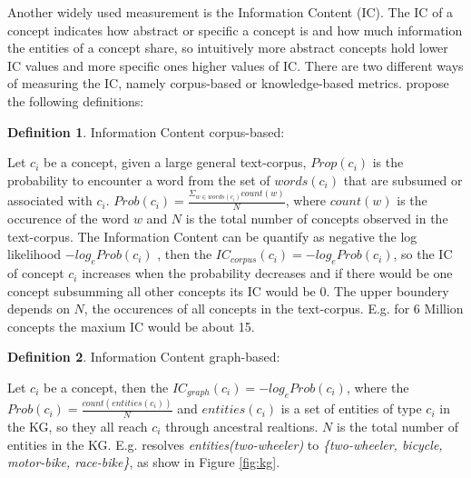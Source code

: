 \documentclass[pdftex,a4paper,12pt]{scrartcl}
\theoremstyle{definition}
\newtheorem{definition}{Definition}[section]
\begin{document}
Another widely used measurement is the Information Content (IC). The IC of a concept indicates how abstract or specific a concept is and how much information the entities of a concept share, so intuitively more abstract concepts hold lower IC values and more specific ones higher values of IC. There are two different ways of measuring the IC, namely corpus-based or knowledge-based metrics. \citet{zhu_computing_2017} propose the following definitions: 
\begin{definition}{Information Content corpus-based:}

Let $c_i$ be a concept, given a large general text-corpus, $Prop(c_i)$ is the probability to encounter a word from the set of $words(c_i)$ that are subsumed or associated with $c_i$. $Prob(c_i)= \frac{\Sigma_{w\in words(c_i)} count(w)}{N}$, where $count(w)$ is the occurence of the word $w$ and $N$ is the total number of concepts observed in the text-corpus. The Information Content can be quantify as negative the log likelihood $-log_e Prob(c_i)$ \citep{resnik_using_1995}, then the $IC_{corpus}(c_i) = -log_e Prob(c_i)$, so the IC of concept $c_i$ increases when the probability decreases and if there would be one concept subsumming all other concepts its IC would be $0$. The upper boundery depends on  $N$, the occurences of all concepts in the text-corpus. E.g. for 6 Million concepts the maxium IC would be about 15.  
\end{definition}
\begin{definition}{Information Content graph-based:}

Let $c_i$ be a concept, then the $IC_{graph}(c_i) = -log_e Prob(c_i)$, where the $Prob(c_i) = \frac{count(entities(c_i))}{N}$ and $entities(c_i)$ is a set of entities of type $c_i$ in the KG, so they all reach $c_i$ through ancestral realtions. $N$ is the total number of entities in the KG. E.g. resolves \textit{entities(two-wheeler)} to \textit{\{two-wheeler, bicycle, motor-bike, race-bike\}}, as show in Figure \ref{fig:kg}. 
\end{definition}

\end{document}
